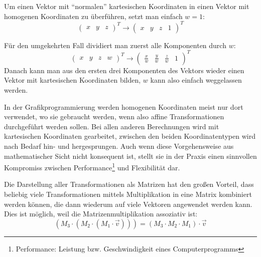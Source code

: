 Um einen Vektor mit \enquote{normalen} kartesischen Koordinaten in einen Vektor mit homogenen Koordinaten zu überführen, setzt man einfach $w = 1$:
\begin{equation}
 \begin{pmatrix} x & y & z \end{pmatrix}^T \rightarrow \begin{pmatrix} x & y & z & 1 \end{pmatrix}^T
\end{equation}

Für den umgekehrten Fall dividiert man zuerst alle Komponenten durch $w$:
\begin{equation}
 \begin{pmatrix} x & y & z & w \end{pmatrix}^T \rightarrow \begin{pmatrix} \frac{x}{w} & \frac{y}{w} & \frac{z}{w} & 1 \end{pmatrix}^T
\end{equation}
Danach kann man aus den ersten drei Komponenten des Vektors wieder einen Vektor mit kartesischen Koordinaten bilden, $w$ kann also einfach weggelassen werden.

In der Grafikprogrammierung werden homogenen Koordinaten meist nur dort verwendet, wo sie gebraucht werden, wenn also affine Transformationen durchgeführt werden sollen. Bei allen anderen Berechnungen wird mit kartesischen Koordinaten gearbeitet, zwischen den beiden Koordinatentypen wird nach Bedarf hin- und hergesprungen. Auch wenn diese Vorgehensweise aus mathematischer Sicht nicht konsequent ist, stellt sie in der Praxis einen sinnvollen Kompromiss zwischen Performance\footnote{Performance: Leistung bzw. Geschwindigkeit eines Computerprogramms} und Flexibilität dar.

\label{transformationmatrixcombination}
Die Darstellung aller Transformationen als Matrizen hat den großen Vorteil, dass beliebig viele Transformationen mittels Multiplikation in eine Matrix kombiniert werden können, die dann wiederum auf viele Vektoren angewendet werden kann. Dies ist möglich, weil die Matrizenmultiplikation assoziativ ist:
\begin{equation}
 \left( M_3 \cdot \left( M_2 \cdot \left( M_1 \cdot \vec v \right) \right) \right) = \left( M_3 \cdot M_2 \cdot M_1 \right) \cdot \vec v
\end{equation} 

